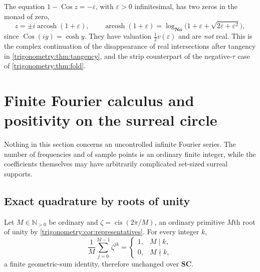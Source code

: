 \documentclass[11pt,letterpaper]{article}
\numberwithin{equation}{section}
\theoremstyle{definition}
\theoremstyle{remark}
\newcommand{\No}{\mathbf{No}}
\newcommand{\SC}{\mathbf{SC}}
\newcommand{\N}{\mathbb N}
\newcommand{\eps}{\varepsilon}
\newcommand{\cis}{\operatorname{cis}}
\newcommand{\arcosh}{\operatorname{arcosh}}
\newcommand{\Cos}{\operatorname{Cos}}
\begin{document}
\begin{example}\label{trigonometry:ex:doublesplit}
The equation $1-\Cos z=-\eps$, with $\eps>0$ infinitesimal, has two zeros in the monad of zero,
\[
 z=\pm i\arcosh(1+\eps),\qquad
 \arcosh(1+\eps)=\log_{\No}\bigl(1+\eps+\sqrt{2\eps+\eps^2}\bigr),
\]
since $\Cos(iy)=\cosh y$. They have valuation $\tfrac12v(\eps)$ and are \emph{not} real. This is
the complex continuation of the disappearance of real intersections after tangency in
\cref{trigonometry:thm:tangency}, and the strip counterpart of the negative-$\tau$ case of
\cref{trigonometry:thm:fold}.
\end{example}

\section{Finite Fourier calculus and positivity on the surreal circle}
\label{trigonometry:sec:fourier}

Nothing in this section concerns an uncontrolled infinite Fourier series. The number of frequencies
and of sample points is an ordinary finite integer, while the coefficients themselves may have
arbitrarily complicated set-sized surreal supports.

\subsection{Exact quadrature by roots of unity}
Let $M\in\N_{>0}$ be ordinary and $\zeta=\cis(2\pi/M)$, an ordinary primitive $M$th root of unity
by \cref{trigonometry:cor:representatives}. For every integer $k$,
\begin{equation}\label{trigonometry:eq:orthogonalityfinite}
 \frac1M\sum_{j=0}^{M-1}\zeta^{jk}=
 \begin{cases}1,&M\mid k,\\0,&M\nmid k,\end{cases}
\end{equation}
a finite geometric-sum identity, therefore unchanged over $\SC$.
\end{document}
